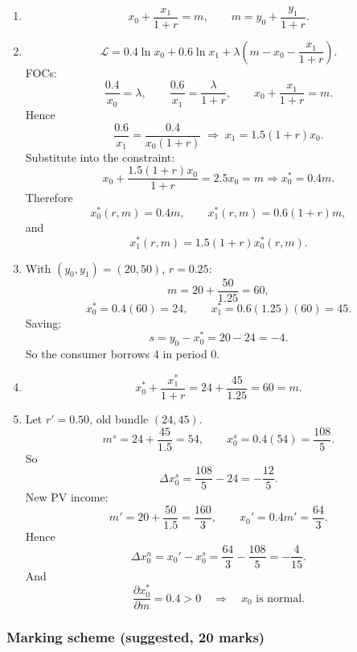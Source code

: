 \documentclass[12pt]{article}
\begin{document}
\begin{enumerate}[label=(\alph*)]
\item
\[
x_0+\frac{x_1}{1+r}=m,\qquad
m=y_0+\frac{y_1}{1+r}.
\]

\item
\[
\mathcal L=0.4\ln x_0+0.6\ln x_1+\lambda\!\left(m-x_0-\frac{x_1}{1+r}\right).
\]
FOCs:
\[
\frac{0.4}{x_0}=\lambda,\qquad
\frac{0.6}{x_1}=\frac{\lambda}{1+r},\qquad
x_0+\frac{x_1}{1+r}=m.
\]
Hence
\[
\frac{0.6}{x_1}=\frac{0.4}{x_0(1+r)}
\;\Longrightarrow\;
x_1=1.5(1+r)x_0.
\]
Substitute into the constraint:
\[
x_0+\frac{1.5(1+r)x_0}{1+r}=2.5x_0=m
\Rightarrow x_0^*=0.4m.
\]
Therefore
\[
\boxed{x_0^*(r,m)=0.4m,\qquad x_1^*(r,m)=0.6(1+r)m,}
\]
and
\[
\boxed{x_1^*(r,m)=1.5(1+r)x_0^*(r,m).}
\]

\item With \((y_0,y_1)=(20,50)\), \(r=0.25\):
\[
m=20+\frac{50}{1.25}=60,
\]
\[
x_0^*=0.4(60)=24,\qquad x_1^*=0.6(1.25)(60)=45.
\]
Saving:
\[
s=y_0-x_0^*=20-24=-4.
\]
So the consumer borrows \(4\) in period 0.

\item
\[
x_0^*+\frac{x_1^*}{1+r}=24+\frac{45}{1.25}=60=m.
\]

\item Let \(r'=0.50\), old bundle \((24,45)\).
\[
m^s=24+\frac{45}{1.5}=54,
\qquad
x_0^s=0.4(54)=\frac{108}{5}.
\]
So
\[
\Delta x_0^s=\frac{108}{5}-24=-\frac{12}{5}.
\]
New PV income:
\[
m'=20+\frac{50}{1.5}=\frac{160}{3},
\qquad
x_0'=0.4m'=\frac{64}{3}.
\]
Hence
\[
\Delta x_0^n=x_0'-x_0^s=\frac{64}{3}-\frac{108}{5}=-\frac{4}{15}.
\]
And
\[
\frac{\partial x_0^*}{\partial m}=0.4>0
\quad\Rightarrow\quad
x_0 \text{ is normal.}
\]
\end{enumerate}

\newpage
\subsubsection*{Marking scheme (suggested, 20 marks)}
\end{document}
